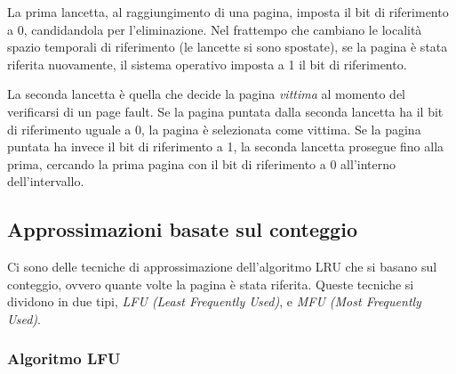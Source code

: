 \documentclass[a4paper,12pt, twoside]{report}
\begin{document}
La prima lancetta, al raggiungimento di una pagina, imposta il bit di riferimento a 0, candidandola per l'eliminazione. 
Nel frattempo che cambiano le localit\`a spazio temporali di riferimento (le lancette si sono spostate), se la pagina \`e 
stata riferita nuovamente, il sistema operativo imposta a 1 il bit di riferimento. 

La seconda lancetta \`e quella che decide la pagina \emph{vittima} al momento del verificarsi di un page fault. Se la 
pagina puntata dalla seconda lancetta ha il bit di riferimento uguale a 0, la pagina \`e selezionata come vittima. Se la 
pagina puntata ha invece il bit di riferimento a 1, la seconda lancetta prosegue fino alla prima, cercando la prima 
pagina con il bit di riferimento a 0 all'interno dell'intervallo.
\begin{center}
\end{center} 

\subsection{Approssimazioni basate sul conteggio}

Ci sono delle tecniche di approssimazione dell'algoritmo LRU che si basano sul conteggio, ovvero quante volte la 
pagina \`e stata riferita. Queste tecniche si dividono in due tipi, \emph{LFU (Least Frequently Used)}, e \emph{MFU (Most Frequently Used)}.

\subsubsection{Algoritmo LFU}
\end{document}
